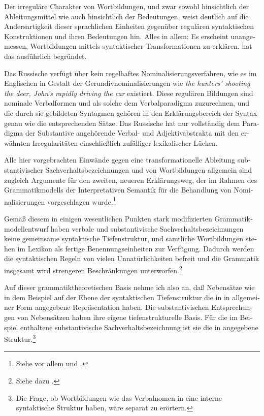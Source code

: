 \documentclass[output=paper]{langscibook}
\begin{document}
\begin{otherlanguage}{german}
Der irreguläre Charakter von Wortbildungen, und zwar sowohl hinsichtlich der Ableitungsmittel wie auch hinsichtlich der Bedeutungen, weist deutlich auf die Andersartigkeit dieser sprachlichen Einheiten gegenüber regulären syntaktischen Konstruktionen und ihren Bedeutungen hin. Alles in allem: Es erscheint unangemessen, Wortbildungen mittels syntaktischer Transformationen zu er\-klä\-ren. \citet{motsch1977ein-pladoyer-fur-die-beschreibung-von-wortbildungen-auf-der-grundlage-des-lexikons, motsch1979zum-status-von-wortbildungsregularitaten} hat das ausführlich begründet.

Das Russische verfügt über kein regelhaftes Nominalisierungsverfahren, wie es im Englischen in Gestalt der Gerundivnominalisierungen wie \textit{the hunters’ shooting the deer, John’s rapidly driving the car} existiert. Diese regulären Bildungen sind nominale Verbalformen und als solche dem Verbalparadigma zuzurechnen, und die durch sie gebildeten Syntagmen gehören in den Erklärungsbereich der Syntax genau wie die entsprechenden Sätze. Das Russische hat nur vollständig dem Paradigma der Substantive angehörende Verbal- und Adjektivabstrakta mit den erwähnten Irregularitäten einschließlich zufälliger lexikalischer Lücken.

Alle hier vorgebrachten Einwände gegen eine transformationelle Ableitung substantivischer Sachverhaltsbezeichnungen und von Wortbildungen allgemein sind zugleich Argumente für den zweiten, neueren Erklärungsweg, der im Rahmen des Grammatikmodells der Interpretativen Semantik für die Behandlung von Nominalisierungen vorgeschlagen wurde.\footnote{Siehe vor allem \citet{chomsky1970remarks-on-nominalization-} und \citet{jackendoff1974introduction-to-the-xbar-convention., jackendoff1975morphological-and-semantic-regularities-in-the-lexicon, jackendoff1977xbar-syntax:-a-study-of-phrase-structure}.}

Gemäß diesem in einigen wesentlichen Punkten stark modifizierten Grammatikmodellentwurf haben verbale und substantivische Sachverhaltsbezeichnungen keine gemeinsame syntaktische Tiefenstruktur, und sämtliche Wortbildungen stehen im Lexikon als fertige Benennungseinheiten zur Verfügung. Dadurch werden die syntaktischen Regeln von vielen Unnatürlichkeiten befreit und die Grammatik insgesamt wird strengeren Beschränkungen unterworfen.\footnote{Siehe dazu \citet{jackendoff1972semantic-interpretation-in-generative-grammar.}.}

\largerpage
Auf dieser grammatiktheoretischen Basis nehme ich also an, daß Nebensätze wie in dem Beispiel  auf der Ebene der syntaktischen Tiefenstruktur die in  in allgemeiner Form angegebene Repräsentation haben. Die substantivischen Entsprechungen von Nebensätzen haben ihre eigene tiefenstrukturelle Basis. Für die im Beispiel  enthaltene substantivische Sachverhaltsbezeichnung ist sie die in  angegebene Struktur.\footnote{Die Frage, ob Wortbildungen wie das Verbalnomen in  eine interne syntaktische Struktur haben, wäre separat zu erörtern.}


\end{otherlanguage}
\end{document}
